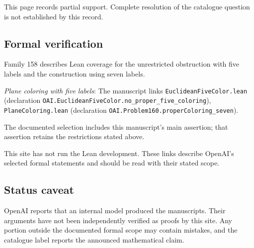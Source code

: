 \documentclass[11pt]{article}
\begin{document}
This page records partial support. Complete resolution of the catalogue question is not established by this record.

\subsection{Formal verification}
Family 158 describes Lean coverage for the unrestricted obstruction with five labels and the construction using seven labels.

\textit{Plane coloring with five labels}: The manuscript links \texttt{EuclideanFiveColor.lean} (declaration \texttt{OAI.EuclideanFiveColor.no\_proper\_five\_coloring}), \texttt{PlaneColoring.lean} (declaration \texttt{OAI.Problem160.properColoring\_seven}).

The documented selection includes this manuscript’s main assertion; that assertion retains the restrictions stated above.

This site has not run the Lean development. These links describe OpenAI’s selected formal statements and should be read with their stated scope.

\subsection{Status caveat}
OpenAI reports that an internal model produced the manuscripts. Their arguments have not been independently verified as proofs by this site. Any portion outside the documented formal scope may contain mistakes, and the catalogue label reports the announced mathematical claim.
\end{document}
